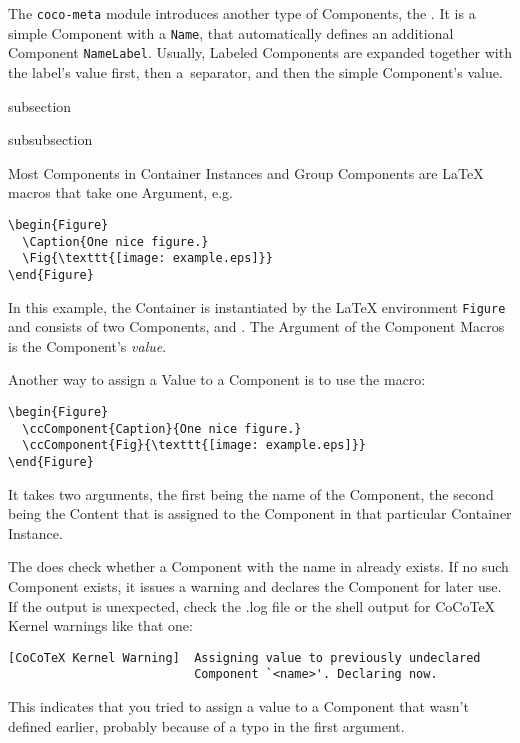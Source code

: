 The \texttt{coco-meta} module introduces another type of Components,
the . It is a simple Component with a
\texttt{Name}, that automatically defines an additional Component
\texttt{NameLabel}. Usually, Labeled Components are expanded together
with the label's value first, then a~separator, and then the simple
Component's value.

\begin{Heading}{subsection}
\end{Heading}

\begin{Heading}{subsubsection}
\end{Heading}

Most Components in Container Instances and Group Components are
{\LaTeX} macros that take one Argument, e.g.
\begin{lstlisting}[style=tex]
\begin{Figure}
  \Caption{One nice figure.}
  \Fig{\texttt{[image: example.eps]}}
\end{Figure}
\end{lstlisting}
In this example, the Container  is
instantiated by the {\LaTeX} environment \lstinline{Figure} and
consists of two Components,  and
. The Argument of the Component Macros is the
Component's \textit{value}.

Another way to assign a Value to a Component is to use the
\DeclareMacro{\ccComponent} macro:
\begin{lstlisting}[style=tex]
\begin{Figure}
  \ccComponent{Caption}{One nice figure.}
  \ccComponent{Fig}{\texttt{[image: example.eps]}}
\end{Figure}
\end{lstlisting}
It takes two arguments, the first being the name of the Component, the
second being the Content that is assigned to the Component in that
particular Container Instance.

The \UsageMacro{\ccComponent} does check whether a Component with the
name in  already exists. If no such Component exists, it
issues a warning and declares the Component for later use. If the
output is unexpected, check the .log file or the shell output for
CoCoTeX Kernel warnings like that one:
\begin{lstlisting}
[CoCoTeX Kernel Warning]  Assigning value to previously undeclared
                          Component `<name>'. Declaring now.
\end{lstlisting}
This indicates that you tried to assign a value to a Component that
wasn't defined earlier, probably because of a typo in the first
argument.

